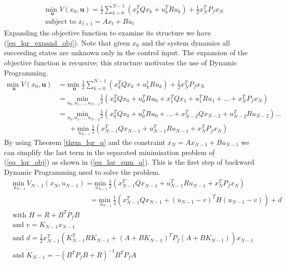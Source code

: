 \begin{equation}
\begin{aligned}
&\underset{\mathbf{u}}{\text{min }} V(x_0, \mathbf{u}) = \frac{1}{2}\sum_{k=0}^{N-1} \left( x_k^TQx_k + u_k^TRu_k \right) + \frac{1}{2}x_N^TP_fx_N \\
& \text{subject to } x_{t+1}=Ax_t+Bu_t
\end{aligned}
\label{eq_lqr_problem}
\end{equation}
Expanding the objective function to examine its structure we have (\ref{eq_lqr_expand_obj}). Note that given $x_0$ and the system dynamics all succeeding states are unknown only in the control input. The expansion of the objective function is recursive; this structure motivates the use of Dynamic Programming.
\begin{equation}
\begin{aligned}
\underset{\mathbf{u}}{\text{min }} V(x_0, \mathbf{u}) &= \underset{\mathbf{u}}{\text{min }} \frac{1}{2}\sum_{k=0}^{N-1} \left( x_k^TQx_k + u_k^tRu_k \right) + \frac{1}{2}x_N^TP_fx_N \\
&= \underset{u_0, u_1,...,u_{N-1}}{\text{min }}  \frac{1}{2}\left( x_0^TQx_0 + u_0^TRu_0 +x_1^TQx_1 + u_1^TRu_1 + ... + x_N^TP_fx_N \right) \\
&= \underset{u_0, u_1,...,u_{N-2}}{\text{min }}  \frac{1}{2}\left( x_0^TQx_0 + u_0^TRu_0 + ... + x_{N-2}^TQx_{N-2} + u_{N-2}^TRu_{N-2} \right)... \\
& \hspace{18pt} + \underset{u_{N-1}}{\text{min }} \frac{1}{2} \left(x_{N-1}^TQx_{N-1}+ u_{N-1}^TRu_{N-1} + x_N^TP_fx_N\right)
\end{aligned}
\label{eq_lqr_expand_obj}
\end{equation}
By using Theorem \ref{thrm_lqr_q} and the constraint $x_N=Ax_{N-1}+Bu_{N-1}$ we can simplify the last term in the separated minimisation problem of (\ref{eq_lqr_obj}) as shown in (\ref{eq_lqr_sum_q}). This is the first step of backward Dynamic Programming used to solve the problem.
\begin{equation}
\begin{aligned}
&\underset{u_{N-1}}{\text{min }}V_{N-1}(x_N, u_{N-1}) =\underset{u_{N-1}}{\text{min }} \frac{1}{2} \left(x_{N-1}^TQx_{N-1}+ u_{N-1}^TRu_{N-1} + x_N^TP_fx_N\right) &\\ 
&\hspace{130pt} = \underset{u_{N-1}}{\text{min }}\frac{1}{2} \left(x_{N-1}^TQx_{N-1} + (u_{N-1}-v)^TH(u_{N-1}-v)\right) + d \\
&\text{with } H = R+B^TP_fB \\
&\text{and } v = K_{N-1}x_{N-1} \\
&\text{and } d = \frac{1}{2}x_{N-1}^T\left(K_{N-1}^TRK_{N-1}+(A+BK_{N-1})^TP_f(A+BK_{N-1})  \right)x_{N-1}\\
&\text{and } K_{N-1} = -(B^TP_fB+R)^{-1}B^TP_fA
\end{aligned}
\label{eq_lqr_sum_q}
\end{equation}

